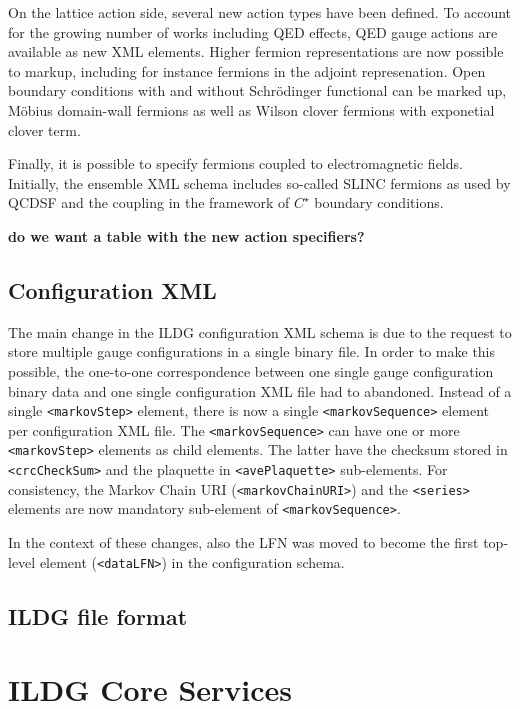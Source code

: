 \documentclass[a4paper,11pt]{article} \usepackage{pos} \usepackage{subcaption}
\begin{document}
On the lattice action side, several new action types have been
defined. To account for the growing number of works including QED
effects, QED gauge actions are available as new XML elements.
Higher fermion representations are now
possible to markup, including for instance fermions in the adjoint
represenation. Open boundary conditions with and without Schrödinger
functional can be marked up, Möbius domain-wall fermions as well as
Wilson clover fermions with exponetial clover term.

Finally, it is possible to specify fermions coupled to electromagnetic
fields. Initially, the ensemble XML schema includes so-called SLINC
fermions as used by QCDSF and the coupling in the framework of
$C^\star$ boundary conditions.

\textbf{do we want a table with the new action specifiers?}

\subsection{Configuration XML}

The main change in the ILDG configuration XML schema is due to the
request to store multiple gauge configurations in a single binary
file. In order to make this possible, the one-to-one correspondence
between one single gauge configuration binary data and one single
configuration XML file had to abandoned. Instead of a single
\texttt{<markovStep>} element, there is 
now a single \texttt{<markovSequence>} element per configuration XML
file. The \texttt{<markovSequence>} can have one or more
\texttt{<markovStep>} elements as child elements. The latter have the
checksum stored in \texttt{<crcCheckSum>} and the plaquette in
\texttt{<avePlaquette>} sub-elements. For consistency, the Markov
Chain URI (\texttt{<markovChainURI>}) and the \texttt{<series>}
elements are now mandatory sub-element of \texttt{<markovSequence>}. 

In the context of these changes, also the LFN was moved to become the
first top-level element (\texttt{<dataLFN>}) in the configuration schema.

\subsection{ILDG file format}

\section{ILDG Core Services}
\end{document}
